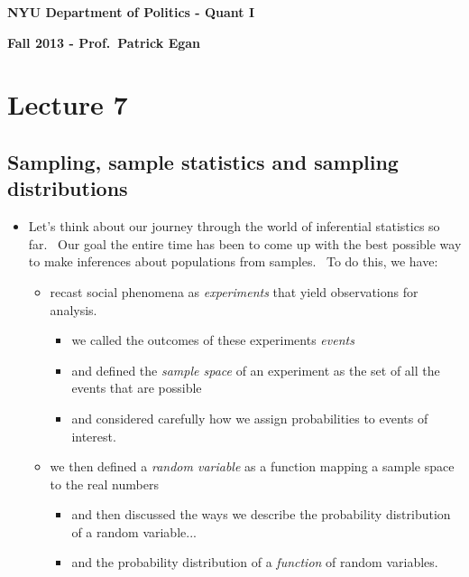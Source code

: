 \documentclass[11pt]{article}
\begin{document}
\singlespacing

\textbf{NYU Department of Politics - Quant I}

\textbf{Fall 2013 - Prof.\ Patrick Egan}

\doublespacing

\section{Lecture 7}

\subsection{Sampling, sample statistics and sampling distributions}

\begin{itemize}
\item Let's think about our journey through the world of inferential
statistics so far. \ Our goal the entire time has been to come up with the
best possible way to make inferences about populations from samples. \ To do
this, we have:

\begin{itemize}
\item recast social phenomena as \textit{experiments }that yield
observations for analysis.

\begin{itemize}
\item we called the outcomes of these experiments \textit{events}

\item and defined the \textit{sample space }of an experiment as the set of
all the events that are possible

\item and considered carefully how we assign probabilities to events of
interest.
\end{itemize}

\item we then defined a \textit{random variable} as a function mapping a
sample space to the real numbers

\begin{itemize}
\item and then discussed the ways we describe the probability distribution
of a random variable...

\item and the probability distribution of a \textit{function }of random
variables.
\end{itemize}
\end{itemize}


\end{itemize}
\end{document}
